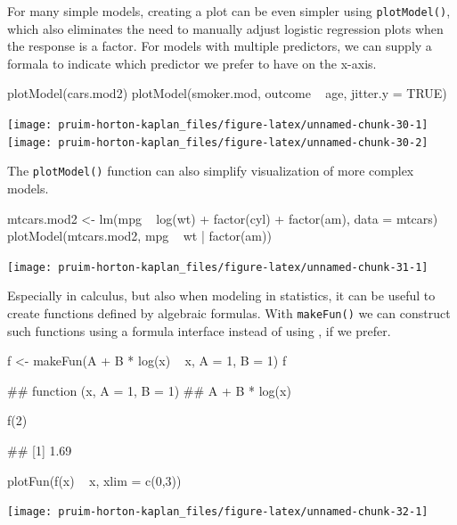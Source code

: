 For many simple models, creating a plot can be even simpler using
\texttt{plotModel()}, which also eliminates the need to manually adjust
logistic regression plots when the response is a factor. For models with
multiple predictors, we can supply a formala to indicate which predictor
we prefer to have on the x-axis.

\begin{Schunk}
\begin{Sinput}
plotModel(cars.mod2)
plotModel(smoker.mod, outcome ~ age, jitter.y = TRUE)
\end{Sinput}


\begin{center}\texttt{[image: pruim-horton-kaplan\_files/figure-latex/unnamed-chunk-30-1]} \texttt{[image: pruim-horton-kaplan\_files/figure-latex/unnamed-chunk-30-2]} \end{center}

\end{Schunk}

\noindent
The \texttt{plotModel()} function can also simplify visualization of
more complex models.

\begin{Schunk}
\begin{Sinput}
mtcars.mod2 <- lm(mpg ~ log(wt) + factor(cyl) + factor(am), data = mtcars)
plotModel(mtcars.mod2, mpg ~ wt | factor(am))
\end{Sinput}


\begin{center}\texttt{[image: pruim-horton-kaplan\_files/figure-latex/unnamed-chunk-31-1]} \end{center}

\end{Schunk}

Especially in calculus, but also when modeling in statistics, it can be
useful to create functions defined by algebraic formulas. With
\texttt{makeFun()} we can construct such functions using a formula
interface instead of using , if we prefer.

\begin{Schunk}
\begin{Sinput}
f <- makeFun(A + B * log(x) ~ x, A = 1, B = 1)
f
\end{Sinput}
\begin{Soutput}
## function (x, A = 1, B = 1) 
## A + B * log(x)
\end{Soutput}
\begin{Sinput}
f(2)
\end{Sinput}
\begin{Soutput}
## [1] 1.69
\end{Soutput}
\begin{Sinput}
plotFun(f(x) ~ x, xlim = c(0,3))
\end{Sinput}


\begin{center}\texttt{[image: pruim-horton-kaplan\_files/figure-latex/unnamed-chunk-32-1]} \end{center}

\end{Schunk}

